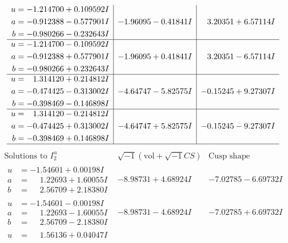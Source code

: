 \documentclass[1p]{elsarticle_modified}
\theoremstyle{definition}
\newcommand{\I}{\sqrt{-1}}
\begin{document}
$$\begin{array}{c|c|c}
\begin{aligned}
u &= -1.214700 + 0.109592 I \\
a &= -0.912388 - 0.577901 I \\
b &= -0.980266 - 0.232643 I\end{aligned}
 & -1.96095 - 0.41841 I & \phantom{-}3.20351 + 6.57114 I \\ \hline\begin{aligned}
u &= -1.214700 - 0.109592 I \\
a &= -0.912388 + 0.577901 I \\
b &= -0.980266 + 0.232643 I\end{aligned}
 & -1.96095 + 0.41841 I & \phantom{-}3.20351 - 6.57114 I \\ \hline\begin{aligned}
u &= \phantom{-}1.314120 + 0.214812 I \\
a &= -0.474425 - 0.313002 I \\
b &= -0.398469 - 0.146898 I\end{aligned}
 & -4.64747 - 5.82575 I & -0.15245 + 9.27307 I \\ \hline\begin{aligned}
u &= \phantom{-}1.314120 - 0.214812 I \\
a &= -0.474425 + 0.313002 I \\
b &= -0.398469 + 0.146898 I\end{aligned}
 & -4.64747 + 5.82575 I & -0.15245 - 9.27307 I\\
 \hline 
 \end{array}$$\newpage$$\begin{array}{c|c|c}  
\text{Solutions to }I^u_{2}& \I (\text{vol} + \sqrt{-1}CS) & \text{Cusp shape}\\
 \hline 
\begin{aligned}
u &= -1.54601 + 0.00198 I \\
a &= \phantom{-}1.22693 + 1.60055 I \\
b &= \phantom{-}2.56709 + 2.18380 I\end{aligned}
 & -8.98731 + 4.68924 I & -7.02785 - 6.69732 I \\ \hline\begin{aligned}
u &= -1.54601 - 0.00198 I \\
a &= \phantom{-}1.22693 - 1.60055 I \\
b &= \phantom{-}2.56709 - 2.18380 I\end{aligned}
 & -8.98731 - 4.68924 I & -7.02785 + 6.69732 I \\ \hline\begin{aligned}
u &= \phantom{-}1.56136 + 0.04047 I \\

\end{aligned}
\end{array}$$
\end{document}
